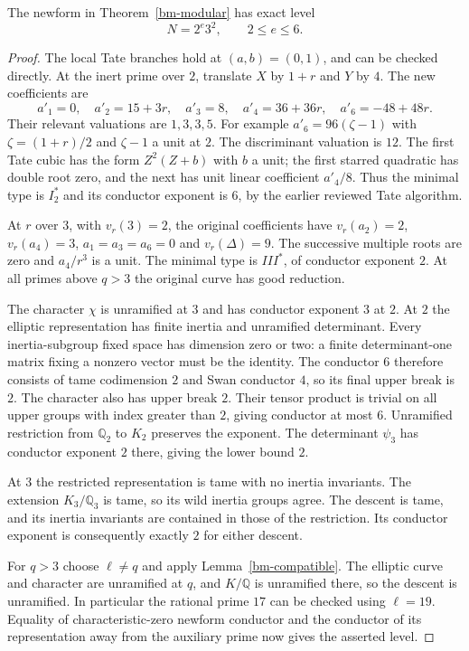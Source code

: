 \begin{proposition}
\label{bm-level}
The newform in Theorem~\ref{bm-modular} has exact level
\[
 N=2^e3^2,\qquad 2\le e\le6.
\]
\end{proposition}
\begin{proof}
The local Tate branches hold at $(a,b)=(0,1)$, and can be checked
directly. At the inert prime over $2$, translate $X$ by $1+r$ and
$Y$ by $4$. The new coefficients are
\[
 a'_1=0,\quad a'_2=15+3r,\quad a'_3=8,\quad
 a'_4=36+36r,\quad a'_6=-48+48r.
\]
Their relevant valuations are $1,3,3,5$. For example
$a'_6=96(\zeta-1)$ with $\zeta=(1+r)/2$ and $\zeta-1$ a unit
at $2$. The discriminant valuation is $12$. The first Tate cubic
has the form $Z^2(Z+b)$ with $b$ a unit; the first starred
quadratic has double root zero, and the next has unit linear
coefficient $a'_4/8$. Thus the minimal type is $I_2^*$ and its
conductor exponent is $6$, by the earlier reviewed Tate algorithm.

At $r$ over $3$, with $v_r(3)=2$, the original coefficients have
$v_r(a_2)=2$, $v_r(a_4)=3$, $a_1=a_3=a_6=0$ and
$v_r(\Delta)=9$. The successive multiple roots are zero and
$a_4/r^3$ is a unit. The minimal type is $III^*$, of conductor
exponent $2$. At all primes above $q>3$ the original curve has good
reduction.

The character $\chi$ is unramified at $3$ and has conductor
exponent $3$ at $2$. At $2$ the elliptic representation has finite
inertia and unramified determinant. Every inertia-subgroup fixed
space has dimension zero or two: a finite determinant-one matrix
fixing a nonzero vector must be the identity. The conductor $6$
therefore consists of tame codimension $2$ and Swan conductor $4$,
so its final upper break is $2$. The character also has upper break
$2$. Their tensor product is trivial on all upper groups with
index greater than $2$, giving conductor at most $6$.
Unramified restriction from $\mathbb Q_2$ to $K_2$ preserves the
exponent. The determinant $\psi_3$ has conductor exponent $2$
there, giving the lower bound $2$.

At $3$ the restricted representation is tame with no inertia
invariants. The extension $K_3/\mathbb Q_3$ is tame, so its wild
inertia groups agree. The descent is tame, and its inertia
invariants are contained in those of the restriction. Its conductor
exponent is consequently exactly $2$ for either descent.

For $q>3$ choose $\ell\ne q$ and apply
Lemma~\ref{bm-compatible}. The elliptic curve and character are
unramified at $q$, and $K/\mathbb Q$ is unramified there, so the
descent is unramified. In particular the rational prime $17$ can
be checked using $\ell=19$. Equality of characteristic-zero
newform conductor and the conductor of its representation away
from the auxiliary prime now gives the asserted level.
\end{proof}

